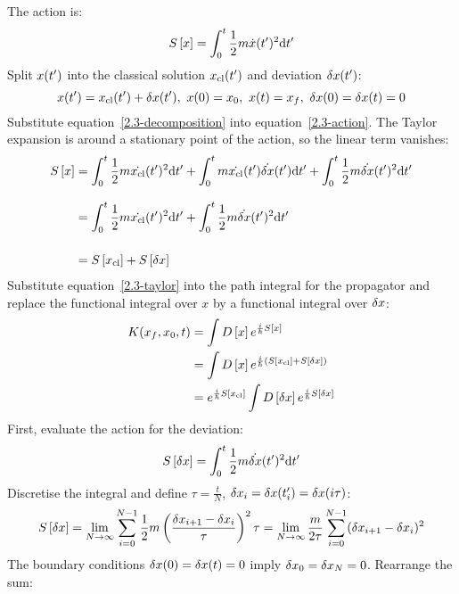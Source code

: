 The action is:
\begin{equation}
  \label{2.3-action}
  S\left[{x}\right] = \int_{0}^{t} \frac{1}{2} m \dot{x}(t^\prime)^2 \text{d}t^\prime
\end{equation}
Split $x(t^\prime)$ into the classical solution $x_{\text{cl}}(t^\prime)$ and deviation $\delta{x}(t^\prime)$:
\begin{equation}
  \label{2.3-decomposition}
  x(t^\prime) = x_{\text{cl}}(t^\prime) + \delta{x}(t^\prime),\
  x(0) = x_0,\
  x(t) = x_f,\
  \delta{x}(0) = \delta{x}(t) = 0
\end{equation}
Substitute equation~\ref{2.3-decomposition} into equation~\ref{2.3-action}.
The Taylor expansion is around a stationary point of the action, so the linear
term vanishes:
\begin{align}
  \label{2.3-taylor}
  S\left[{x}\right]
   & =
  \int_{0}^{t} \frac{1}{2} m \dot{x_{\text{cl}}}(t^\prime)^2 \text{d}t^\prime +
  \int_{0}^{t} m \dot{x_{\text{cl}}}(t^\prime)\dot{\delta{x}}(t^\prime) \text{d}t^\prime +
  \int_{0}^{t} \frac{1}{2} m \dot{\delta{x}}(t^\prime)^2 \text{d}t^\prime
  \nonumber
  \\[2ex]
   & =
  \int_{0}^{t} \frac{1}{2} m \dot{x_{\text{cl}}}(t^\prime)^2 \text{d}t^\prime +
  \int_{0}^{t} \frac{1}{2} m \dot{\delta{x}}(t^\prime)^2 \text{d}t^\prime
  \nonumber
  \\[3ex]
   & =
  S\left[{x_{\text{cl}}}\right] + S\left[{\delta{x}}\right]
\end{align}
Substitute equation~\ref{2.3-taylor} into the path integral for the propagator and
replace the functional integral over $x$ by a functional integral over $\delta{x}$:
\begin{align}
  K(x_f, x_0, t)
   & = \int D\left[{x}\right] e^{\frac{i}{\hbar} S\left[{x}\right]} \nonumber
  \\
   & = \int D\left[{x}\right] e^{\frac{i}{\hbar} (S\left[{x_{\text{cl}}}\right] + S\left[{\delta{x}}\right])} \nonumber
  \\
  \label{2.3-propagator}
   & = e^{\frac{i}{\hbar} S\left[{x_{\text{cl}}}\right]} \int D\left[{\delta{x}}\right] e^{\frac{i}{\hbar} S\left[{\delta{x}}\right]}
\end{align}
First, evaluate the action for the deviation:
\begin{equation*}
  S\left[{\delta{x}}\right] = \int_{0}^{t} \frac{1}{2} m \dot{\delta{x}}(t^\prime)^2 \text{d}t^\prime
\end{equation*}
Discretise the integral and define $\tau = \frac{t}{N}$,
$\delta{x}_i = \delta{x}(t^\prime_i) = \delta{x}(i\tau)$:
\begin{equation*}
  S\left[{\delta{x}}\right]
  =
  \lim_{N \to \infty} \sum_{i=0}^{N-1} \frac{1}{2} m \left(\frac{\delta{x}_{i+1} - \delta{x}_i}{\tau}\right)^2 \tau
  =
  \lim_{N \to \infty} \frac{m}{2\tau} \sum_{i=0}^{N-1} (\delta{x}_{i+1}-\delta{x}_i)^2
\end{equation*}
The boundary conditions $\delta{x}(0) = \delta{x}(t) = 0$ imply $\delta{x}_0 = \delta{x}_N = 0$.
Rearrange the sum:
